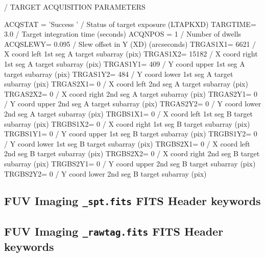 {              / TARGET ACQUISITION PARAMETERS

ACQSTAT = 'Success '           / Status of target exposure (LTAPKXD)
TARGTIME=                  3.0 / Target integration time (seconds)
ACQNPOS =                    1 / Number of dwells
ACQSLEWY=                0.095 / Slew offset in Y (XD) (arcseconds)
TRGAS1X1=                 6621 / X coord left  1st seg A target subarray (pix)
TRGAS1X2=                15182 / X coord right 1st seg A target subarray (pix)
TRGAS1Y1=                  409 / Y coord upper 1st seg A target subarray (pix)
TRGAS1Y2=                  484 / Y coord lower 1st seg A target subarray (pix)
TRGAS2X1=                    0 / X coord left  2nd seg A target subarray (pix)
TRGAS2X2=                    0 / X coord right 2nd seg A target subarray (pix)
TRGAS2Y1=                    0 / Y coord upper 2nd seg A target subarray (pix)
TRGAS2Y2=                    0 / Y coord lower 2nd seg A target subarray (pix)
TRGBS1X1=                    0 / X coord left  1st seg B target subarray (pix)
TRGBS1X2=                    0 / X coord right 1st seg B target subarray (pix)
TRGBS1Y1=                    0 / Y coord upper 1st seg B target subarray (pix)
TRGBS1Y2=                    0 / Y coord lower 1st seg B target subarray (pix)
TRGBS2X1=                    0 / X coord left  2nd seg B target subarray (pix)
TRGBS2X2=                    0 / X coord right 2nd seg B target subarray (pix)
TRGBS2Y1=                    0 / Y coord upper 2nd seg B target subarray (pix)
TRGBS2Y2=                    0 / Y coord lower 2nd seg B target subarray (pix)
}

\subsection{FUV Imaging \texttt{\_spt.fits} FITS Header keywords}\label{subsec:FsptSUB}

\subsection{FUV Imaging \texttt{\_rawtag.fits} FITS Header keywords}\label{subsec:FfitsSUB}

